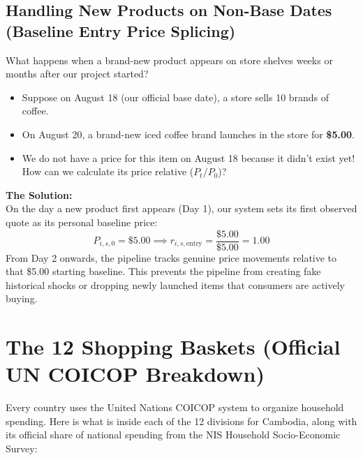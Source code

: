 \documentclass[11pt,a4paper,oneside]{article}
\begin{document}
\subsection{Handling New Products on Non-Base Dates (Baseline Entry Price Splicing)}
What happens when a brand-new product appears on store shelves weeks or months after our project started?
\begin{itemize}
    \item Suppose on August 18 (our official base date), a store sells 10 brands of coffee.
    \item On August 20, a brand-new iced coffee brand launches in the store for \textbf{\$5.00}.
    \item We do not have a price for this item on August 18 because it didn't exist yet! How can we calculate its price relative ($P_t / P_0$)?
\end{itemize}
\textbf{The Solution:}\\
On the day a new product first appears (Day 1), our system sets its first observed quote as its personal baseline price:
$$P_{i, s, 0} = \$5.00 \implies r_{i, s, \text{entry}} = \frac{\$5.00}{\$5.00} = \mathbf{1.00}$$
From Day 2 onwards, the pipeline tracks genuine price movements relative to that \$5.00 starting baseline. This prevents the pipeline from creating fake historical shocks or dropping newly launched items that consumers are actively buying.

\newpage

\section{The 12 Shopping Baskets (Official UN COICOP Breakdown)}

Every country uses the United Nations COICOP system to organize household spending. Here is what is inside each of the 12 divisions for Cambodia, along with its official share of national spending from the NIS Household Socio-Economic Survey:
\end{document}

